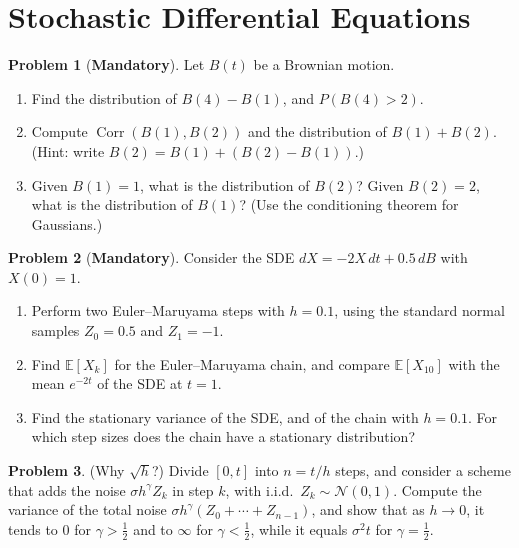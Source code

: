 \documentclass[11pt]{article}
\theoremstyle{definition}
\newtheorem{problem}{Problem}[section]
\newcommand{\mandatory}{\textcolor{red!70!black}{\textbf{Mandatory}}}
\newcommand{\E}{\mathbb{E}}
\DeclareMathOperator{\Corr}{Corr}
\begin{document}
\section{Stochastic Differential Equations}

\begin{problem}[\mandatory]\label{pr:brownian}
    Let $B(t)$ be a Brownian motion.
    \begin{enumerate}[label=(\alph*)]
        \item Find the distribution of $B(4) - B(1)$, and $P(B(4) > 2)$.
        \item Compute $\Corr(B(1), B(2))$ and the distribution of $B(1) + B(2)$. (Hint: write $B(2) = B(1) + (B(2) - B(1))$.)
        \item Given $B(1) = 1$, what is the distribution of $B(2)$? Given $B(2) = 2$, what is the distribution of $B(1)$? (Use the conditioning theorem for Gaussians.)
    \end{enumerate}
\end{problem}

\begin{problem}[\mandatory]\label{pr:euler-maruyama}
    Consider the SDE $dX = -2X\,dt + 0.5\,dB$ with $X(0) = 1$.
    \begin{enumerate}[label=(\alph*)]
        \item Perform two Euler--Maruyama steps with $h = 0.1$, using the standard normal samples $Z_0 = 0.5$ and $Z_1 = -1$.
        \item Find $\E[X_k]$ for the Euler--Maruyama chain, and compare $\E[X_{10}]$ with the mean $e^{-2t}$ of the SDE at $t = 1$.
        \item Find the stationary variance of the SDE, and of the chain with $h = 0.1$. For which step sizes does the chain have a stationary distribution?
    \end{enumerate}
\end{problem}

\begin{problem}\label{pr:sqrt-h}
    (Why $\sqrt{h}$?) Divide $[0, t]$ into $n = t/h$ steps, and consider a scheme that adds the noise $\sigma h^\gamma Z_k$ in step $k$, with i.i.d.\ $Z_k \sim \mathcal{N}(0, 1)$. Compute the variance of the total noise $\sigma h^\gamma(Z_0 + \cdots + Z_{n-1})$, and show that as $h \to 0$, it tends to $0$ for $\gamma > \frac{1}{2}$ and to $\infty$ for $\gamma < \frac{1}{2}$, while it equals $\sigma^2t$ for $\gamma = \frac{1}{2}$.
\end{problem}
\end{document}
